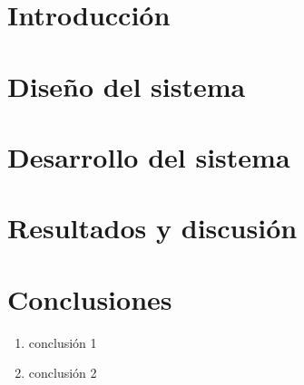
%




\section{Introducción}
\label{intro}


\section{Diseño del sistema}
\label{design}




\section{Desarrollo del sistema}
\label{development}



\section{Resultados y discusión}
\label{results}




\section{Conclusiones}
\label{conclusiones}

\begin{enumerate}
    \item conclusión 1
    \item conclusión 2
\end{enumerate}
